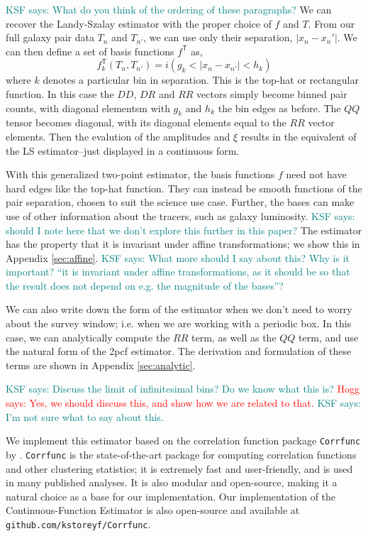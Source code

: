 \documentclass[modern]{aastex62}
\newcommand{\cf}{2pcf\xspace} %
\newcommand{\est}{the Continuous-Function Estimator\xspace}
\newcommand{\LS}{LS\xspace}
\newcommand{\T}{^{\mathsf{T}}}
\newcommand{\KSF}[1]{\textcolor{teal}{KSF says: #1}}
\newcommand{\hogg}[1]{\textcolor{red}{Hogg says: #1}}
\begin{document}
\KSF{What do you think of the ordering of these paragraphs?}
We can recover the Landy-Szalay estimator with the proper choice of $f$ and $T$.
From our full galaxy pair data $T_n$ and $T_{n'}$, we can use only their separation,  $|x_n - x_n'|$.
We can then define a set of basis functions $f\T$ as,
\begin{equation}
f\T_k(T_n, T_{n'}) =  i(g_k < |x_n - x_{n'}| < h_k)
\end{equation}
where $k$ denotes a particular bin in separation.
This is the top-hat or rectangular function.
In this case the $DD$, $DR$ and $RR$ vectors simply become binned pair counts, with diagonal elementsm with $g_k$ and $h_k$ the bin edges as before.
The $QQ$ tensor becomes diagonal, with its diagonal elements equal to the $RR$ vector elements.
Then the evalution of the amplitudes and $\xi$ results in the equivalent of the \LS estimator--just displayed in a continuous form.

With this generalized two-point estimator, the basis functions $f$ need not have hard edges like the top-hat function.
They can instead be smooth functions of the pair separation, chosen to suit the science use case.
Further, the bases can make use of other information about the tracers, such as galaxy luminosity.
\KSF{should I note here that we don't explore this further in this paper?}
The estimator has the property that it is invariant under affine transformations; we show this in Appendix \ref{sec:affine}. \KSF{What more should I say about this? Why is it important? ``it is invariant under affine transformations, as it should be so that the result does not depend on e.g. the magnitude of the bases''?}

We can also write down the form of the estimator when we don't need to worry about the survey window; i.e. when we are working with a periodic box.
In this case, we can analytically compute the $RR$ term, as well as the $QQ$ term, and use the natural form of the \cf estimator.
The derivation and formulation of these terms are shown in Appendix \ref{sec:analytic}.

\KSF{Discuss the limit of infinitesimal bins? Do we know what this is?} \hogg{Yes, we should discuss this, and show how we are related to that.} \KSF{I'm not sure what to say about this.}

We implement this estimator based on the correlation function package \texttt{Corrfunc} by \cite{Sinha2019}.
\texttt{Corrfunc} is the state-of-the-art package for computing correlation functions and other clustering statistics; it is extremely fast and user-friendly, and is used in many published analyses.
It is also modular and open-source, making it a natural choice as a base for our implementation.
Our implementation of \est is also open-source and available at \texttt{github.com/kstoreyf/Corrfunc}.
\end{document}
